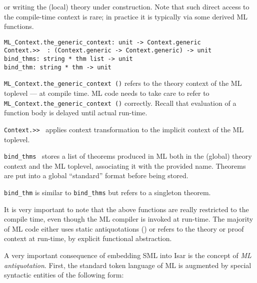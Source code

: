 \begin{isabellebody}
\begin{isamarkuptext}
  or writing the (local) theory under construction.  Note that such
  direct access to the compile-time context is rare; in practice it is
  typically via some derived ML functions.%
\end{isamarkuptext}%
\isamarkuptrue%
%
\isadelimmlref
%
\endisadelimmlref
%
\isatagmlref
%
\begin{isamarkuptext}%
\begin{mldecls}
  \verb|ML_Context.the_generic_context: unit -> Context.generic| \\
  \verb|Context.>>  : (Context.generic -> Context.generic) -> unit| \\
  \verb|bind_thms: string * thm list -> unit| \\
  \verb|bind_thm: string * thm -> unit| \\
  \end{mldecls}

  \begin{description}

  \item \verb|ML_Context.the_generic_context ()| refers to the theory
  context of the ML toplevel --- at compile time.  ML code needs to
  take care to refer to \verb|ML_Context.the_generic_context ()|
  correctly.  Recall that evaluation of a function body is delayed
  until actual run-time.

  \item \verb|Context.>>|~ applies context transformation
   to the implicit context of the ML toplevel.

  \item \verb|bind_thms|~ stores a list of
  theorems produced in ML both in the (global) theory context and the
  ML toplevel, associating it with the provided name.  Theorems are
  put into a global ``standard'' format before being stored.

  \item \verb|bind_thm| is similar to \verb|bind_thms| but refers to a
  singleton theorem.

  \end{description}

  It is very important to note that the above functions are really
  restricted to the compile time, even though the ML compiler is
  invoked at run-time.  The majority of ML code either uses static
  antiquotations () or refers to the theory or
  proof context at run-time, by explicit functional abstraction.%
\end{isamarkuptext}%
\isamarkuptrue%
%
\endisatagmlref
{\isafoldmlref}%
%
\isadelimmlref
%
\endisadelimmlref
%
\isamarkuptrue%
%
\begin{isamarkuptext}%
A very important consequence of embedding SML into Isar is the
  concept of \emph{ML antiquotation}.  First, the standard token
  language of ML is augmented by special syntactic entities of the
  following form:


\end{isamarkuptext}
\end{isabellebody}
